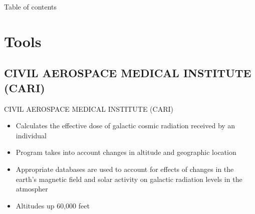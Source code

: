 \documentclass[aspectratio=1610]{beamer}
\newcommand{\semitransp}[2][35]{\color{fg!#1}#2}
\begin{document}
\begin{frame}{Table of contents}
  \tableofcontents
 
\end{frame}

\section{Tools}
\subsection{\semitransp[40]{CIVIL AEROSPACE MEDICAL INSTITUTE (CARI)}}

\begin{frame}



\vspace{-2cm}
\begin{block}{CIVIL AEROSPACE MEDICAL INSTITUTE (CARI)}
\end{block}

\begin{itemize}
\item  Calculates the effective dose of galactic cosmic radiation received by an individual
\item  Program takes into account changes in altitude and geographic location 
\item  Appropriate databases are used to account for effects of changes in the earth's magnetic field and solar activity on galactic radiation levels in the atmospher
\item  Altitudes up 60,000 feet
\end{itemize}
\end{frame}
\end{document}
